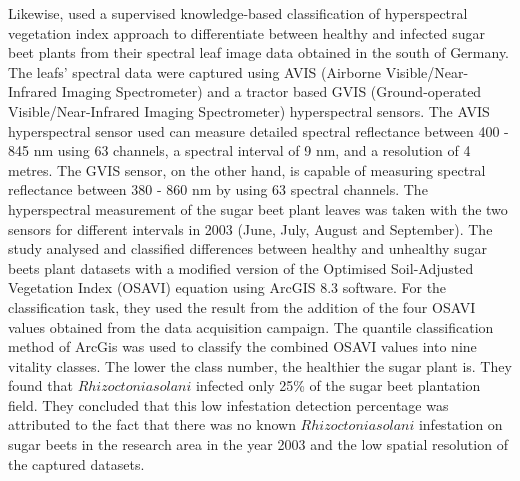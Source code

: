 \item Likewise, \cite{laudien2005multitemporal} used a supervised knowledge-based classification of hyperspectral vegetation index approach to differentiate between healthy and infected sugar beet plants from their spectral leaf image data obtained in the south of Germany. The leafs’ spectral data were captured using AVIS (Airborne Visible/Near-Infrared Imaging Spectrometer) and a tractor based GVIS (Ground-operated Visible/Near-Infrared Imaging Spectrometer) hyperspectral sensors. The AVIS hyperspectral sensor used can measure detailed spectral reflectance between 400 - 845 nm using 63 channels, a spectral interval of 9 nm, and a resolution of 4 metres. The GVIS sensor, on the other hand, is capable of measuring spectral reflectance between 380 - 860 nm by using 63 spectral channels. The hyperspectral measurement of the sugar beet plant leaves was taken with the two sensors for different intervals in 2003 (June, July, August and September). The study analysed and classified differences between healthy and unhealthy sugar beets plant datasets with a modified version of the Optimised Soil-Adjusted Vegetation Index (OSAVI) equation using ArcGIS 8.3 software. For the classification task, they used the result from the addition of the four OSAVI values obtained from the data acquisition campaign. The quantile classification method of ArcGis was used to classify the combined OSAVI values into nine vitality classes. The lower the class number, the healthier the sugar plant is. They found that $Rhizoctonia solani$ infected only 25\% of the sugar beet plantation field. They concluded that this low infestation detection percentage was attributed to the fact that there was no known $Rhizoctonia solani$ infestation on sugar beets in the research area in the year 2003 and the low spatial resolution of the captured datasets.

